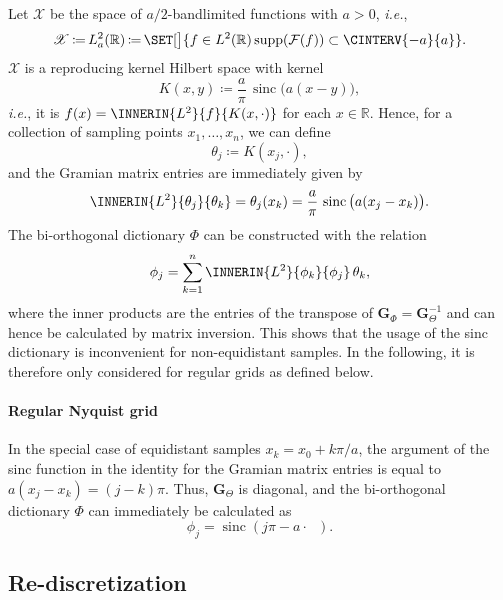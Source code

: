 \documentclass[a4paper]{paper}
\newcommand*{\SPC}[1]{{\ensuremath{\mathscr{#1}}}}
\newcommand*{\SPCX}{\SPC{X}}
\newcommand{\RR}{{\ensuremath{\mathbb{R}}}}
\newcommand*{\OP}[1]{{\ensuremath{\mathcal{#1}}}}
\newcommand*{\FT}{\OP{F}}
\providecommand\GIVEN{}  %
\DeclareMathOperator{\SUPP}{{supp}}
\DeclareMathOperator{\SINC}{{sinc}}
\DeclareMathOperator{\DEFEQ}{{\coloneqq}}
\newcommand*{\ie}{\textsl{i.e.}\xspace}
\newcommand*{\BDG}{\boldsymbol{G}}
\begin{document}
Let $\SPCX$ be the space of $a/2$-bandlimited functions with $a > 0$, \ie, 
%
\begin{equation*}
 \SPCX \DEFEQ L^2_a(\RR) \DEFEQ \SET[\big]{f \in L^2(\RR) \GIVEN \SUPP(\FT(f)) \subset \CINTERV{-a}{a}}.
\end{equation*}
%
$\SPCX$ is a reproducing kernel Hilbert space with kernel
%
\begin{equation*}
 K(x,y) \DEFEQ \frac{a}{\pi}\, \SINC\big( a(x-y) \big),
\end{equation*}
%
\ie, it is $f(x) = \INNERIN{L^2}{f}{K(x, \cdot)}$ for each $x\in \RR$. Hence, for a collection of sampling points $x_1, 
\dots, x_n$, we can define
%
\begin{equation*}
 \theta_j \DEFEQ K(x_j, \cdot),
\end{equation*}
%
and the Gramian matrix entries are immediately given by 
%
\begin{equation*}
 \INNERIN{L^2}{\theta_j}{\theta_k} = \theta_j(x_k) 
 = \frac{a}{\pi}\, \SINC\big( a(x_j - x_k) \big).
\end{equation*}
%
The bi-orthogonal dictionary $\Phi$ can be constructed with the relation
%
\begin{equation*}
 \phi_j = \sum_{k=1}^n \INNERIN{L^2}{\phi_k}{\phi_j}\, \theta_k,
\end{equation*}
%
where the inner products are the entries of the transpose of $\BDG_\Phi = \BDG_\Theta^{-1}$ and can hence be calculated 
by matrix inversion. This shows that the usage of the sinc dictionary is inconvenient for non-equidistant samples. 
In the following, it is therefore only considered for regular grids as defined below.

\paragraph{Regular Nyquist grid}

In the special case of equidistant samples $x_k = x_0 + k\pi/a$, the argument of the 
sinc function in the identity for the Gramian matrix entries is equal to $a(x_j - x_k) = (j-k)\pi$. Thus, 
$\BDG_\Theta$ is diagonal, and the bi-orthogonal dictionary $\Phi$ can immediately be calculated as
%
\begin{equation*}
 \phi_j = \SINC( j\pi - a\cdot\phantom{x}\!\!).
\end{equation*}





\subsection{Re-discretization}
\label{subsec:specif:rediscr}
\end{document}
